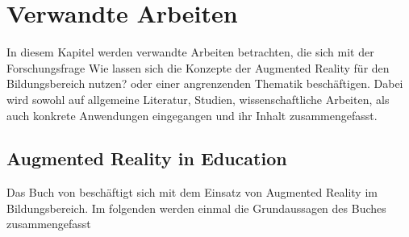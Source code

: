 \chapter{Verwandte Arbeiten}\label{chapter:arbeiten}
In diesem Kapitel werden verwandte Arbeiten betrachten, die sich mit der Forschungsfrage \glqq Wie lassen sich die Konzepte der Augmented Reality für den Bildungsbereich nutzen?\grqq{} oder einer angrenzenden Thematik beschäftigen. Dabei wird sowohl auf allgemeine Literatur, Studien, wissenschaftliche Arbeiten, als auch konkrete Anwendungen eingegangen und ihr Inhalt zusammengefasst.

\section{Augmented Reality in Education}
Das Buch \citep{geroimenko:ar-in-education} von \citeauthor{geroimenko:ar-in-education} beschäftigt sich mit dem Einsatz von Augmented Reality im Bildungsbereich. Im folgenden werden einmal die Grundaussagen des Buches zusammengefasst

